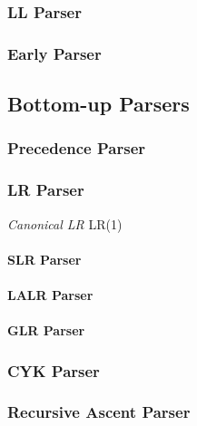 \subsubsection{LL Parser}\label{sec:ll_parser}

\subsubsection{Early Parser}\label{sec:early_parser}



\subsection{Bottom-up Parsers}\label{sec:bottomup_parser}

\subsubsection{Precedence Parser}\label{sec:precedence_parser}

\subsubsection{LR Parser}\label{sec:lr_parser}

\emph{Canonical LR} LR(1)

\paragraph{SLR Parser}\label{sec:slr_parser}

\paragraph{LALR Parser}\label{sec:lalr_parser}

\paragraph{GLR Parser}\label{sec:glr_parser}



\subsubsection{CYK Parser}\label{sec:cyk_parser}

\subsubsection{Recursive Ascent Parser}\label{sec:recursive_ascent}



